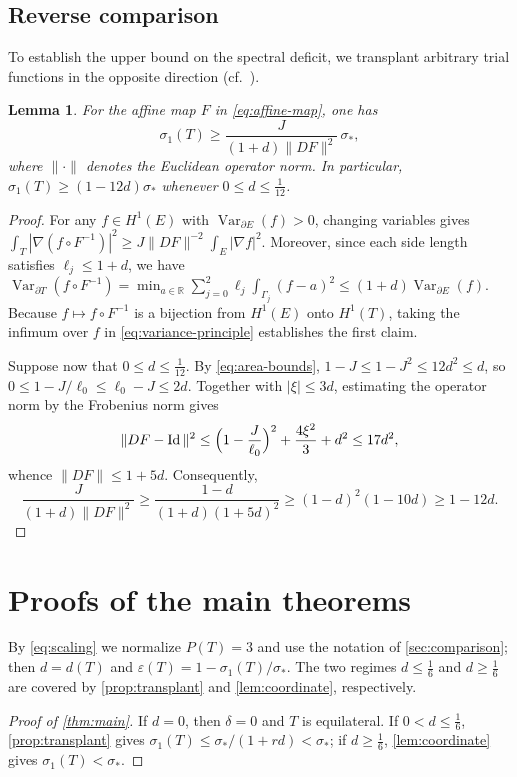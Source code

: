 \documentclass[11pt,reqno]{amsart}
\numberwithin{equation}{section}
\newtheorem{lemma}[lemma]{Lemma}
\theoremstyle{remark}
\newcommand{\R}{\mathbb R}
\DeclareMathOperator{\Var}{Var}
\DeclareMathOperator{\Id}{Id}
\begin{document}
\subsection{Reverse comparison}
To establish the upper bound on the spectral deficit, we transplant arbitrary trial
functions in the opposite direction (cf.\ \cite{FL}).

\begin{lemma}\label{lem:reverse}
For the affine map $F$ in \eqref{eq:affine-map}, one has
\[
 \sigma_1(T)\ge\frac{J}{(1+d)\|DF\|^2}\,\sigma_*,
\]
where $\|\cdot\|$ denotes the Euclidean operator norm. In particular,
$\sigma_1(T)\ge(1-12d)\sigma_*$ whenever $0\le d\le\frac1{12}$.
\end{lemma}
\begin{proof}
For any $f\in H^1(E)$ with $\Var_{\partial E}(f)>0$, changing variables gives
$\int_T|\nabla(f\circ F^{-1})|^2\ge J\|DF\|^{-2}\int_E|\nabla f|^2$. Moreover,
since each side length satisfies $\ell_j\le1+d$, we have
$\Var_{\partial T}(f\circ F^{-1})=\min_{a\in\R}\sum_{j=0}^2\ell_j\int_{\Gamma_j}(f-a)^2
\le(1+d)\Var_{\partial E}(f)$. Because $f\mapsto f\circ F^{-1}$ is a bijection
from $H^1(E)$ onto $H^1(T)$, taking the infimum over $f$ in
\eqref{eq:variance-principle} establishes the first claim.

Suppose now that $0\le d\le\frac1{12}$. By \eqref{eq:area-bounds},
$1-J\le1-J^2\le12d^2\le d$, so $0\le1-J/\ell_0\le\ell_0-J\le2d$. Together with
$|\xi|\le3d$, estimating the operator norm by the Frobenius norm gives
\[
 \|DF-\Id\|^2\le\Bigl(1-\frac J{\ell_0}\Bigr)^2+\frac{4\xi^2}3+d^2\le17d^2,
\]
whence $\|DF\|\le1+5d$.
Consequently,
\[
 \frac{J}{(1+d)\|DF\|^2}
 \ge\frac{1-d}{(1+d)(1+5d)^2}
 \ge(1-d)^2(1-10d)\ge1-12d.
\]
\end{proof}

\section{Proofs of the main theorems}\label{sec:proofs}
By \eqref{eq:scaling} we normalize $P(T)=3$ and use the notation of
\cref{sec:comparison}; then $d=d(T)$ and
$\varepsilon(T)=1-\sigma_1(T)/\sigma_*$. The two regimes $d\le\frac16$ and
$d\ge\frac16$ are covered by \cref{prop:transplant} and
\cref{lem:coordinate}, respectively.

\begin{proof}[Proof of \cref{thm:main}]
If $d=0$, then $\delta=0$ and $T$ is equilateral. If $0<d\le\frac16$,
\cref{prop:transplant} gives $\sigma_1(T)\le\sigma_*/(1+rd)<\sigma_*$; if
$d\ge\frac16$, \cref{lem:coordinate} gives $\sigma_1(T)<\sigma_*$.
\end{proof}
\end{document}
